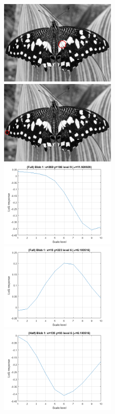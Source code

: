 \begin{figure}[h]
	\includegraphics[width=0.5\textwidth]{figures/a3_butterfly_keypoint.png}
	\includegraphics[width=0.5\textwidth]{figures/a3_butterfly_keypoint_2.png}
	\includegraphics[width=0.5\textwidth]{figures/a3_butterfly_log_full.png}
	\includegraphics[width=0.5\textwidth]{figures/a3_butterfly_log_full_2.png}
	\includegraphics[width=0.5\textwidth]{figures/a3_butterfly_log_half.png}

\end{figure}
